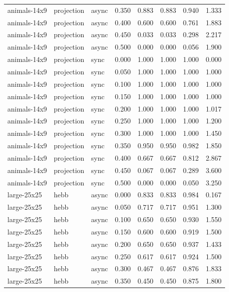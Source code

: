 \begin{tabular}{lllrrrrr}
animals-14x9 & projection & async & 0.350 & 0.883 & 0.883 & 0.940 & 1.333 \\
animals-14x9 & projection & async & 0.400 & 0.600 & 0.600 & 0.761 & 1.883 \\
animals-14x9 & projection & async & 0.450 & 0.033 & 0.033 & 0.298 & 2.217 \\
animals-14x9 & projection & async & 0.500 & 0.000 & 0.000 & 0.056 & 1.900 \\
animals-14x9 & projection & sync & 0.000 & 1.000 & 1.000 & 1.000 & 0.000 \\
animals-14x9 & projection & sync & 0.050 & 1.000 & 1.000 & 1.000 & 1.000 \\
animals-14x9 & projection & sync & 0.100 & 1.000 & 1.000 & 1.000 & 1.000 \\
animals-14x9 & projection & sync & 0.150 & 1.000 & 1.000 & 1.000 & 1.000 \\
animals-14x9 & projection & sync & 0.200 & 1.000 & 1.000 & 1.000 & 1.017 \\
animals-14x9 & projection & sync & 0.250 & 1.000 & 1.000 & 1.000 & 1.200 \\
animals-14x9 & projection & sync & 0.300 & 1.000 & 1.000 & 1.000 & 1.450 \\
animals-14x9 & projection & sync & 0.350 & 0.950 & 0.950 & 0.982 & 1.850 \\
animals-14x9 & projection & sync & 0.400 & 0.667 & 0.667 & 0.812 & 2.867 \\
animals-14x9 & projection & sync & 0.450 & 0.067 & 0.067 & 0.289 & 3.600 \\
animals-14x9 & projection & sync & 0.500 & 0.000 & 0.000 & 0.050 & 3.250 \\
large-25x25 & hebb & async & 0.000 & 0.833 & 0.833 & 0.984 & 0.167 \\
large-25x25 & hebb & async & 0.050 & 0.717 & 0.717 & 0.951 & 1.300 \\
large-25x25 & hebb & async & 0.100 & 0.650 & 0.650 & 0.930 & 1.550 \\
large-25x25 & hebb & async & 0.150 & 0.600 & 0.600 & 0.919 & 1.500 \\
large-25x25 & hebb & async & 0.200 & 0.650 & 0.650 & 0.937 & 1.433 \\
large-25x25 & hebb & async & 0.250 & 0.617 & 0.617 & 0.924 & 1.500 \\
large-25x25 & hebb & async & 0.300 & 0.467 & 0.467 & 0.876 & 1.833 \\
large-25x25 & hebb & async & 0.350 & 0.450 & 0.450 & 0.875 & 1.800 \\

\end{tabular}
